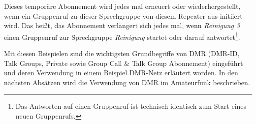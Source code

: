 Dieses temporäre Abonnement wird jedes mal erneuert oder wiederhergestellt, wenn ein Gruppenruf zu dieser Sprechgruppe von diesem Repeater aus initiiert wird. Das heißt, das Abonnement verlängert sich jedes mal, wenn \emph{Reinigung 3} einen Gruppenruf zur Sprechgruppe \emph{Reinigung} startet oder darauf antwortet\footnote{Das Antworten auf einen Gruppenruf ist technisch identisch zum Start eines neuen Gruppenrufs.}.

Mit diesen Beispielen sind die wichtigsten Grundbegriffe von DMR (DMR-ID, Talk Groups, Private sowie Group Call \& Talk Group Abonnement) eingeführt und deren Verwendung in einem Beispiel DMR-Netz erläutert worden. In den nächsten Absätzen wird die Verwendung von DMR im Amateurfunk beschrieben.


